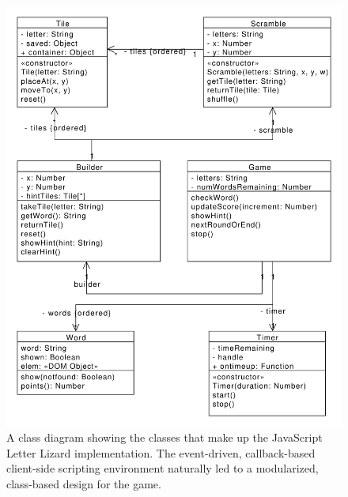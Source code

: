 \begin{figure}
    \centering
	\includegraphics[scale=0.6]{../diagrams/LetterLizardJS-ClassDiagram.pdf}
	\caption{A class diagram showing the classes that make up the JavaScript Letter
	Lizard implementation. The event-driven, callback-based client-side scripting
	environment naturally led to a modularized, class-based design for the game.}
\end{figure}


